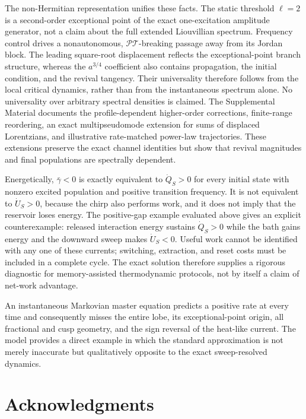 \documentclass[reprint,superscriptaddress,floatfix,amsmath,amssymb,prresearch,aps]{revtex4-2}
\begin{document}
The non-Hermitian representation unifies these facts. The static threshold
\(\ell=2\) is a second-order exceptional point of the exact one-excitation
amplitude generator, not a claim about the full extended Liouvillian spectrum.
Frequency control drives a nonautonomous, \(\mathcal{PT}\)-breaking passage
away from its Jordan block. The leading square-root displacement reflects the
exceptional-point branch structure, whereas the \(a^{3/4}\) coefficient also
contains propagation, the initial condition, and the revival tangency. Their
universality therefore follows from the local critical dynamics, rather than
from the instantaneous spectrum alone. No universality over arbitrary
spectral densities is claimed. The Supplemental Material documents the
profile-dependent higher-order corrections, finite-range reordering, an exact
multipseudomode extension for sums of displaced Lorentzians, and illustrative
rate-matched power-law trajectories. These extensions preserve the exact
channel identities but show that revival magnitudes and final populations are
spectrally dependent.

Energetically, \(\bar\gamma<0\) is exactly equivalent to
\(\dot Q_S>0\) for every initial state with nonzero excited population and
positive transition frequency. It is not equivalent to \(\dot U_S>0\),
because the chirp also performs work, and it does not imply that the reservoir
loses energy. The positive-gap example evaluated above gives an explicit
counterexample: released interaction energy sustains \(\dot Q_S>0\) while the
bath gains energy and the downward sweep makes \(\dot U_S<0\). Useful work
cannot be identified with any one of these currents; switching, extraction,
and reset costs must be included in a complete cycle. The exact solution
therefore supplies a rigorous diagnostic for memory-assisted thermodynamic
protocols, not by itself a claim of net-work advantage.

An instantaneous Markovian master equation predicts a positive rate at every
time and consequently misses the entire lobe, its exceptional-point origin,
all fractional and cusp geometry, and the sign reversal of the heat-like
current. The model provides a direct example in which the standard
approximation is not merely inaccurate but qualitatively opposite to the exact
sweep-resolved dynamics.

\section*{Acknowledgments}
\end{document}
